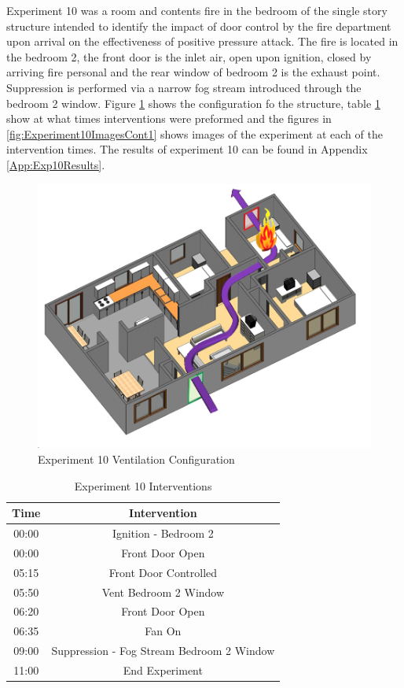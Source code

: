 \documentclass{article}
\begin{document}
Experiment 10 was a room and contents fire in the bedroom of the single story structure intended to identify the impact of door control by the fire department upon arrival on the effectiveness of positive pressure attack. The fire is located in the bedroom 2, the front door is the inlet air, open upon ignition, closed by arriving fire personal and the rear window of bedroom 2 is the exhaust point. Suppression is performed via a narrow fog stream introduced through the bedroom 2 window. Figure \ref{fig:Exp10VentConfig} shows the configuration fo the structure, table \ref{Table:Exp10Interventions} show at what times interventions were preformed and the figures in \ref{fig:Experiment10ImagesCont1} shows images of the experiment at each of the intervention times. The results of experiment 10 can be found in Appendix \ref{App:Exp10Results}.

\begin{figure}[h!]
	\centering
	\includegraphics[width=5in]{0_Images/FireExperiments/Single_Story/Experiment_10.jpg}
	\caption{Experiment 10 Ventilation Configuration}
	\label{fig:Exp10VentConfig}
\end{figure}

\begin{table}[H]
	\centering
	\caption{Experiment 10 Interventions}
	\begin{tabular}{|c|c|} 
		\hline
		Time & Intervention \\ \hline \hline
		00:00 & Ignition - Bedroom 2 \\ \hline
		00:00 & Front Door Open \\ \hline
		05:15 & Front Door Controlled \\ \hline
		05:50 & Vent Bedroom 2 Window\\ \hline
		06:20 & Front Door Open \\ \hline
		06:35 & Fan On \\ \hline
		09:00 & Suppression - Fog Stream Bedroom 2 Window\\ \hline
		11:00 & End Experiment\\ \hline
	\end{tabular}
	\label{Table:Exp10Interventions}
\end{table}
\end{document}
